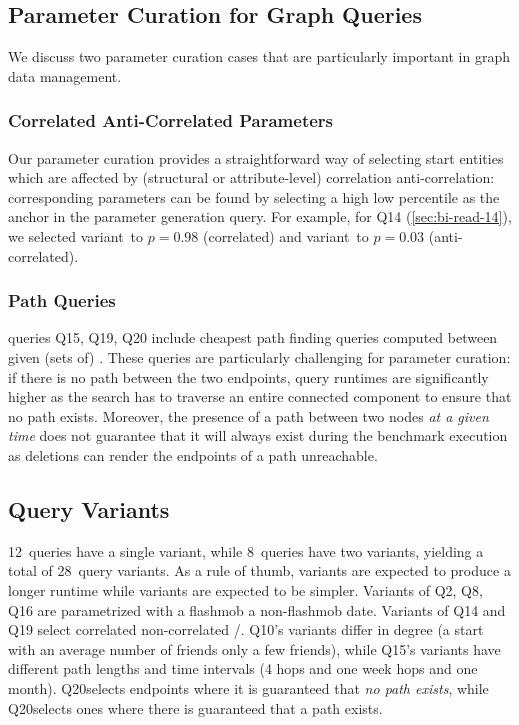 \subsection{Parameter Curation for Graph Queries}

We discuss two parameter curation cases that are particularly important in graph data management.

\subsubsection{Correlated \vs Anti-Correlated Parameters}
\label{sec:paramgen-correlations}

Our parameter curation provides a straightforward way of selecting start entities which
are affected by (structural or attribute-level) correlation \vs anti-correlation:
corresponding parameters can be found by selecting a high \vs low percentile as the anchor
in the parameter generation query.
For example, for Q14 (\autoref{sec:bi-read-14}),
we selected
variant~\variantA to $p=0.98$ (correlated) and
variant~\variantB to $p=0.03$ (anti-correlated).

\subsubsection{Path Queries}
\label{sec:path-queries}

\snbbi queries Q15, Q19, Q20 include cheapest path finding queries computed between given (sets of) \tPersons.
These queries are particularly challenging for parameter curation:
if there is no path between the two endpoints, query runtimes are significantly higher as the search has to traverse an entire connected component to ensure that no path exists.
Moreover, the presence of a path between two nodes \emph{at a given time} does not guarantee that it will always exist during the benchmark execution as deletions can render the endpoints of a path unreachable.

\subsection{Query Variants}
\label{sec:query-variants}

12~queries have a single variant, while 8~queries have two variants, yielding a total of 28~query variants.
As a rule of thumb, variants \variantA are expected to produce a longer runtime
while variants \variantB are expected to be simpler.
Variants of Q2, Q8, Q16 are parametrized with a flashmob \vs a non-flashmob date.
Variants of Q14 and Q19 select correlated \vs non-correlated \tCountries/\tCities.
Q10's variants differ in degree (a start \tPerson with an average number of friends \vs only a few friends), while
Q15's variants have different path lengths and time intervals (4 hops and one week  hops and one month).
Q20\variantA selects endpoints where it is guaranteed that \emph{no path exists}, while Q20\variantB selects ones where there is guaranteed that a path exists.

